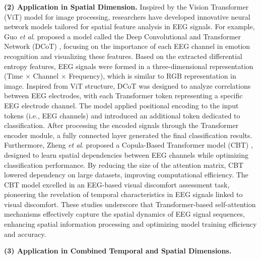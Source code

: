 \documentclass[preprint,12pt]{elsarticle}
\newcommand{\etal}{\textit{et al}. }
\begin{document}
\textbf{(2) Application in Spatial Dimension.}
Inspired by the Vision Transformer (ViT) model for image processing, researchers have developed innovative neural network models tailored for spatial feature analysis in EEG signals. For example, Guo \etal proposed a model called the Deep Convolutional and Transformer Network (DCoT) \cite{guo2022transformer}, focusing on the importance of each EEG channel in emotion recognition and visualizing these features. Based on the extracted differential entropy features, EEG signals were formed in a three-dimensional representation (Time $\times$ Channel $\times$ Frequency), which is similar to RGB representation in image. Inspired from ViT structure, DCoT was designed to analyze correlations between EEG electrodes, with each Transformer token representing a specific EEG electrode channel. The model applied positional encoding to the input tokens (i.e., EEG channels) and introduced an additional token dedicated to classification. After processing the encoded signals through the Transformer encoder module, a fully connected layer generated the final classification results. Furthermore, Zheng \etal proposed a Copula-Based Transformer model (CBT) \cite{zheng2022copula}, designed to learn spatial dependencies between EEG channels while optimizing classification performance. By reducing the size of the attention matrix, CBT lowered dependency on large datasets, improving computational efficiency. The CBT model excelled in an EEG-based visual discomfort assessment task, pioneering the revelation of temporal characteristics in EEG signals linked to visual discomfort. These studies underscore that Transformer-based self-attention mechanisms effectively capture the spatial dynamics of EEG signal sequences, enhancing spatial information processing and optimizing model training efficiency and accuracy.

\textbf{(3) Application in Combined Temporal and Spatial Dimensions.}
\end{document}
